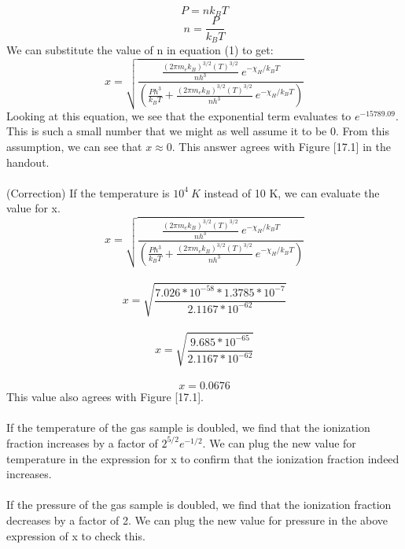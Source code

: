 \documentclass[10pt]{article}
\begin{document}
\[ P = n k_{B} T\]
\[ n = \frac{P}{k_{B} T}\]
We can substitute the value of n in equation (1) to get:
\[ x = \sqrt{\frac{\frac{(2\pi m_{e} k_{B})^{3/2} (T)^{3/2}}{n h^3} \ e^{-\chi_{H}/k_{B}T}}{(\frac{P h^3}{k_{B}T} + \frac{(2\pi m_{e} k_{B})^{3/2} (T)^{3/2}}{n h^3} \ e^{-\chi_{H}/k_{B}T})}} \]
Looking at this equation, we see that the exponential term evaluates to $e^{-15789.09}$. This is such a small number that we might as well assume it to be 0. From this assumption, we can see that $x \approx 0$.
This answer agrees with Figure [17.1] in the handout.\\ \\
(Correction) If the temperature is $10^4 \ K$ instead of 10 K, we can evaluate the value for x.
\[ x = \sqrt{\frac{\frac{(2\pi m_{e} k_{B})^{3/2} (T)^{3/2}}{n h^3} \ e^{-\chi_{H}/k_{B}T}}{(\frac{P h^3}{k_{B}T} + \frac{(2\pi m_{e} k_{B})^{3/2} (T)^{3/2}}{n h^3} \ e^{-\chi_{H}/k_{B}T})}} \]\\
\[ x = \sqrt{\frac{7.026*10^{-58}*1.3785*10^{-7}}{2.1167*10^{-62}}}\]\\
\[ x = \sqrt{\frac{9.685 * 10^{-65}}{2.1167 * 10^{-62}}}\]\\
\[ x = 0.0676\]
This value also agrees with Figure [17.1].\\ \\
If the temperature of the gas sample is doubled, we find that the ionization fraction increases by a factor of $2^{5/2}e^{-1/2}$. We can plug the new value for temperature in the expression for x to confirm that the ionization fraction indeed increases.\\ \\
If the pressure of the gas sample is doubled, we find that the ionization fraction decreases by a factor of 2. We can plug the new value for pressure in the above expression of x to check this. \\
\end{document}

